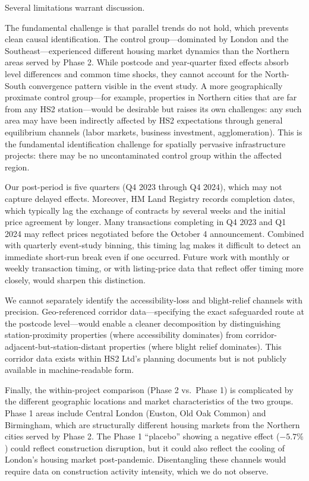 \documentclass[12pt]{article}
\begin{document}
Several limitations warrant discussion.

The fundamental challenge is that parallel trends do not hold, which prevents clean causal identification. The control group---dominated by London and the Southeast---experienced different housing market dynamics than the Northern areas served by Phase 2. While postcode and year-quarter fixed effects absorb level differences and common time shocks, they cannot account for the North-South convergence pattern visible in the event study. A more geographically proximate control group---for example, properties in Northern cities that are far from any HS2 station---would be desirable but raises its own challenges: any such area may have been indirectly affected by HS2 expectations through general equilibrium channels (labor markets, business investment, agglomeration). This is the fundamental identification challenge for spatially pervasive infrastructure projects: there may be no uncontaminated control group within the affected region.

Our post-period is five quarters (Q4 2023 through Q4 2024), which may not capture delayed effects. Moreover, HM Land Registry records completion dates, which typically lag the exchange of contracts by several weeks and the initial price agreement by longer. Many transactions completing in Q4 2023 and Q1 2024 may reflect prices negotiated before the October 4 announcement. Combined with quarterly event-study binning, this timing lag makes it difficult to detect an immediate short-run break even if one occurred. Future work with monthly or weekly transaction timing, or with listing-price data that reflect offer timing more closely, would sharpen this distinction.

We cannot separately identify the accessibility-loss and blight-relief channels with precision. Geo-referenced corridor data---specifying the exact safeguarded route at the postcode level---would enable a cleaner decomposition by distinguishing station-proximity properties (where accessibility dominates) from corridor-adjacent-but-station-distant properties (where blight relief dominates). This corridor data exists within HS2 Ltd's planning documents but is not publicly available in machine-readable form.

Finally, the within-project comparison (Phase 2 vs.\ Phase 1) is complicated by the different geographic locations and market characteristics of the two groups. Phase 1 areas include Central London (Euston, Old Oak Common) and Birmingham, which are structurally different housing markets from the Northern cities served by Phase 2. The Phase 1 ``placebo'' showing a negative effect ($-5.7\%$) could reflect construction disruption, but it could also reflect the cooling of London's housing market post-pandemic. Disentangling these channels would require data on construction activity intensity, which we do not observe.
\end{document}
